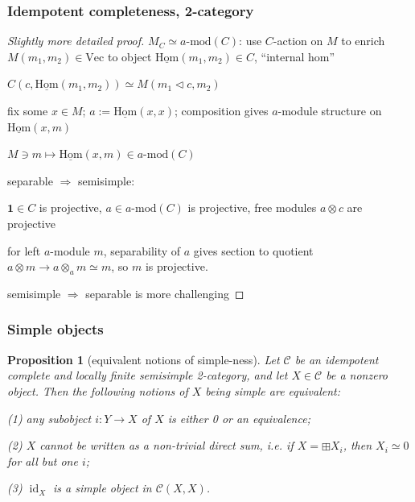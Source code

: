 \documentclass{beamer}
\newcommand{\tnsr}{\otimes}
\DeclareMathOperator{\id}{id}
\newcommand{\one}{\mathbf{1}}
\newtheorem{proposition}[theorem]{Proposition}
\newcommand{\cC}{{\mathcal{C}}}
\newcommand{\Vect}{{\textrm{Vec}}}
\newcommand{\amod}[1]{{#1\textrm{-mod}}}
\newcommand{\ihom}{{\underline{\textrm{Hom}}}}
\newcommand{\ract}{{\triangleleft}}
\begin{document}
\begin{frame}
\frametitle{Idempotent completeness, 2-category}

\begin{proof}[Slightly more detailed proof]
$M_C \simeq \amod{a}(C)$:
\pause
use $C$-action on $M$ to enrich $M(m_1,m_2) \in \Vect$
to object $\ihom(m_1,m_2) \in C$, ``internal hom''

\pause
\hspace{10pt}
$C(c, \ihom(m_1,m_2)) \simeq M(m_1 \ract c, m_2)$

\pause
fix some $x \in M$;
\pause
$a := \ihom(x,x)$;
\pause
composition gives $a$-module structure
on $\ihom(x,m)$

\pause
$M \ni m \mapsto \ihom(x,m) \in \amod{a}(C)$
\\
\vspace{10pt}

\pause
separable $\Rightarrow$ semisimple:

\pause
$\one \in C$ is projective,
\pause
$a \in \amod{a}(C)$ is projective,
\pause
free modules $a \tnsr c$ are projective

\pause
for left $a$-module $m$,
\pause
separability of $a$ gives section to
quotient $a \tnsr m \to a \tnsr_a m \simeq m$,
so $m$ is projective.

\pause
semisimple $\Rightarrow$ separable is more challenging
\end{proof}

\end{frame}
\begin{frame}
\frametitle{Simple objects}

\pause

\begin{proposition}[equivalent notions of simple-ness]
Let $\cC$ be an idempotent complete and
locally finite semisimple 2-category,
and let $X \in \cC$ be a nonzero object.
Then the following notions of $X$ being simple are equivalent:

\pause

(1) any subobject $i: Y \to X$ of $X$
 is either 0 or an equivalence;

\pause

(2) $X$ cannot be written as a non-trivial direct sum,
	i.e. if $X = \boxplus X_i$,
	then $X_i \simeq 0$ for all but one $i$;

\pause

(3) $\id_X$ is a simple object in $\cC(X,X)$.
\end{proposition}

\end{frame}
\end{document}

